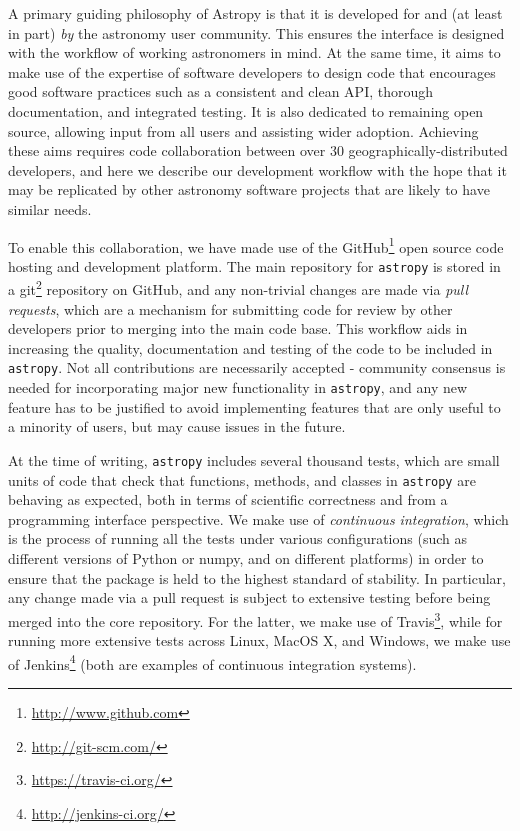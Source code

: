 \documentclass[traditabstract]{aa}
\newcommand{\astropy}{\texttt{astropy}\xspace}
\begin{document}
\label{sec:workflow}




A primary guiding philosophy of Astropy is that it is developed for and (at least in part)
\emph{by} the astronomy user community.  This ensures the interface is 
designed with the workflow of working astronomers in mind.  At the same time, it aims
to make use of the expertise of software developers to design code that encourages
good software practices such as a consistent and clean API, thorough documentation,
and integrated testing.  It is also dedicated to remaining open source, allowing input from
all users and assisting wider adoption. Achieving these aims requires code collaboration
between over 30 geographically-distributed developers, and here we describe
our development workflow with the hope that it may be replicated by other astronomy
software projects that are likely to have similar needs. 

To enable this collaboration, we have made use of the 
GitHub\footnote{\url{http://www.github.com}} open source code hosting and
development  platform. The main repository for \astropy is stored in a
git\footnote{\url{http://git-scm.com/}} repository on GitHub, and any
non-trivial changes are made via \textit{pull requests}, which are a mechanism
for submitting code for review by other developers prior to merging into the
main code base. This workflow aids in increasing the quality, documentation and
testing of the code to be included in \astropy. Not all contributions are
necessarily accepted - community consensus is needed for incorporating major
new functionality in \astropy, and any new feature has to be justified to avoid
implementing features that are only useful to a minority of users, but may
cause issues in the future.

At the time of writing, \astropy includes several thousand tests, which are
small units of code that check that functions, methods, and classes in \astropy
are behaving as expected, both in terms of scientific correctness and from a
programming interface perspective. We make use of \textit{continuous
integration}, which is the process of running all the tests under various
configurations (such as different versions of Python or \gls{numpy}, and on different
platforms) in order to ensure that the package is held to the highest standard
of stability. In particular, any change made via a pull request is subject to
extensive testing before being merged into the core repository. For the latter,
we make use of Travis\footnote{\url{https://travis-ci.org/}}, while for running
more extensive tests across Linux, MacOS X, and Windows, we make use of
Jenkins\footnote{\url{http://jenkins-ci.org/}} (both are examples of continuous
integration systems).
\end{document}
